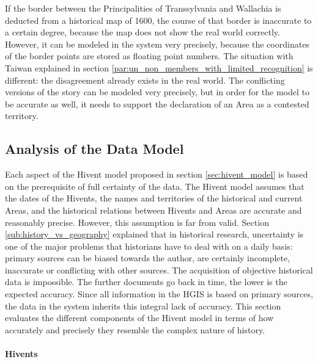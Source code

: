 If the border between the Principalities of Transsylvania and Wallachia is deducted from a historical map of 1600, the course of that border is inaccurate to a certain degree, because the map does not show the real world correctly. However, it can be modeled in the system very precisely, because the coordinates of the border points are stored as floating point numbers.
The situation with Taiwan explained in section \ref{par:un_non_members_with_limited_recognition} is different: the disagreement already exists in the real world. The conflicting versions of the story can be modeled very precisely, but in order for the model to be accurate as well, it needs to support the declaration of an Area as a contested territory.

\subsection{Analysis of the Data Model} %
\label{sub:data_model}

Each aspect of the Hivent model proposed in section \ref{sec:hivent_model} is based on the prerequisite of full certainty of the data. The Hivent model assumes that the dates of the Hivents, the names and territories of the historical and current Areas, and the historical relations between Hivents and Areas are accurate and reasonably precise. However, this assumption is far from valid. Section \ref{sub:history_vs_geography} explained that in historical research, uncertainty is one of the major problems that historians have to deal with on a daily basis: primary sources can be biased towards the author, are certainly incomplete, inaccurate or conflicting with other sources. The acquisition of objective historical data is impossible. The further documents go back in time, the lower is the expected accuracy. Since all information in the HGIS is based on primary sources, the data in the system inherits this integral lack of accuracy. This section evaluates the different components of the Hivent model in terms of how accurately and precisely they resemble the complex nature of history.

\paragraph{Hivents} %
\label{par:evaluation_hivents}

